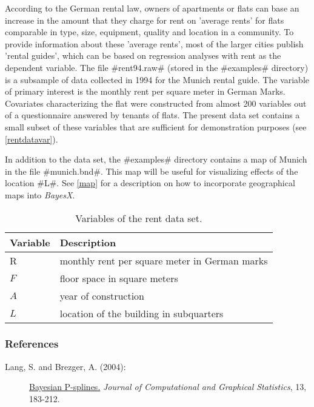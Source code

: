 According to the German rental law, owners of apartments or flats
can base an increase in the amount that they charge for rent on
'average rents' for flats comparable in type, size, equipment,
quality and location in a community. To provide information about
these 'average rents', most of the larger cities publish 'rental
guides', which can be based on regression analyses with rent as
the dependent variable. The file #rent94.raw# (stored in the
#examples# directory) is a subsample of data collected in 1994 for
the Munich rental guide. The variable of primary interest is the
monthly rent per square meter in German Marks. Covariates
characterizing the flat were constructed from almost 200 variables
out of a questionnaire answered by tenants of flats. The present
data set contains a small subset of these variables that are
sufficient for demonstration purposes (see \autoref{rentdatavar}).

In addition to the data set, the #examples# directory contains a
map of Munich in the file #munich.bnd#. This map will be useful
for visualizing effects of the location #L#. See \autoref{map} for
a description on how to incorporate geographical maps into {\em
BayesX}.

\begin{table}

\centering
\begin{tabular}{|l|l|}
\hline
{\bf Variable} & {\bf Description} \\
\hline
R & monthly rent per square meter in German marks \\
$F$ & floor space in square meters \\
$A$ & year of construction \\
$L$ & location of the building in subquarters \\
 \hline
\end{tabular}
{\em \caption{\label{rentdatavar}Variables of the rent data set.}}
\end{table}


\subsubsection*{References}

\begin{description}

\item[Lang, S. and Brezger, A. (2004):]
\href{http://www.stat.uni-muenchen.de/~lang/publications.html}
{Bayesian P-splines.} {\it Journal of Computational and Graphical
Statistics}, 13, 183-212.

\end{description}


